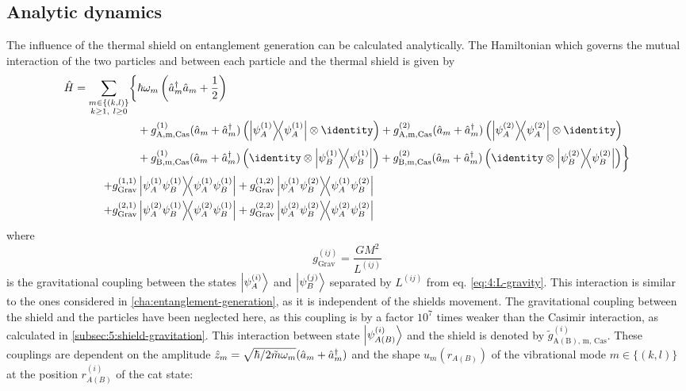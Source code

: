 \subsection{Analytic dynamics}
The influence of the thermal shield on entanglement generation can be calculated analytically. 
The Hamiltonian which governs the mutual interaction of the two particles and between each particle and the thermal shield is given by
\begin{align}\label{eq:5:hamiltonian}
  \begin{split}
    \op{H} = \sum_{\substack{m\in\{(k,l)\}\\ k \geq 1,\ l \geq 0}} \biggl\{ & \hbar \omega_m \left(\op{a}^\dagger_m \op{a}_m + \frac{1}{2}\right) \\
    &+ g^{(1)}_\mathrm{A,m,Cas}(\op{a}_m + \op{a}^\dagger_m) \left( \ketbra{\psi^{(1)}_A} \otimes \identity \right)
     + g^{(2)}_\mathrm{A,m,Cas}(\op{a}_m + \op{a}^\dagger_m) \left( \ketbra{\psi^{(2)}_A} \otimes \identity \right) \\
    &+ g^{(1)}_\mathrm{B,m,Cas}(\op{a}_m + \op{a}^\dagger_m) \left( \identity \otimes \ketbra{\psi^{(1)}_B} \right)
     + g^{(2)}_\mathrm{B,m,Cas}(\op{a}_m + \op{a}^\dagger_m) \left( \identity \otimes \ketbra{\psi^{(2)}_B} \right)\biggr\} \\
    + g^{(1,1)}_\mathrm{Grav}&\ketbra{\psi^{(1)}_A \psi^{(1)}_B} + g^{(1,2)}_\mathrm{Grav}\ketbra{\psi^{(1)}_A \psi^{(2)}_B} \\
    + g^{(2,1)}_\mathrm{Grav}&\ketbra{\psi^{(2)}_A \psi^{(1)}_B} + g^{(2,2)}_\mathrm{Grav}\ketbra{\psi^{(2)}_A \psi^{(2)}_B}
  \end{split}
\end{align}
where 
\begin{equation}
  g^{(ij)}_\mathrm{Grav} = \frac{G M^2}{L^{(ij)}}
\end{equation}
is the gravitational coupling between the states $\ket{\psi^{(i)}_A}$ and $\ket{\psi^{(j)}_B}$ separated by $L^{(ij)}$ from eq. \eqref{eq:4:L-gravity}.
This interaction is similar to the ones considered in \cref{cha:entanglement-generation}, as it is independent of the shields movement.
The gravitational coupling between the shield and the particles have been neglected here, as this coupling is by a factor $10^{7}$ times weaker than the Casimir interaction, as calculated in \cref{subsec:5:shield-gravitation}.
This interaction between state $\ket{\psi_{A(B)}^{(i)}}$ and the shield is denoted by $\tilde{g}^{(i)}_\mathrm{A(B),\,m,\,Cas}$. These couplings are dependent on the amplitude $\hat{z}_{m} = \sqrt{\hbar/2\tilde{m}\omega_m} (\hat{a}_m + \hat{a}^\dagger_m)$ and the shape $u_{m}(r_{A(B)})$ of the vibrational mode $m\in\{(k,l)\}$ at the position $r^{(i)}_{A(B)}$ of the cat state:
